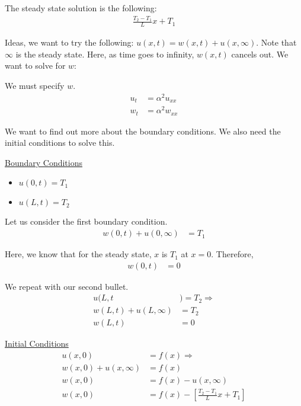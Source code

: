 
The steady state solution is the following:
%
\begin{align}
  \frac{T_2 - T_1}{L} x + T_1
\end{align}

Ideas, we want to try the following: $u(x, t) = w(x, t) + u(x, \infty)$. Note that $\infty$ is the steady state. Here, as time goes to infinity, $w(x, t)$ cancels out. We want to solve for $w$:

We must specify $w$.
%
\begin{align}
  u_t & = \alpha^2 u_{xx}\\
  w_t & = \alpha^2 w_{xx}
\end{align}

We want to find out more about the boundary conditions. We also need the initial conditions to solve this.

\underline{Boundary Conditions}
\begin{itemize}
  \item $u(0, t) = T_1$
  \item $u(L, t) = T_2$
\end{itemize}

Let us consider the first boundary condition.
%
\begin{align}
  w(0, t) + u(0, \infty) & = T_1
\end{align}

Here, we know that for the steady state, $x$ is $T_1$ at $x = 0$. Therefore,
%
\begin{align}
  w(0, t) & = 0
\end{align}

We repeat with our second bullet.
%
\begin{align}
  u(L, t &) = T_2 \Rightarrow\\
  w(L, t) + u(L, \infty) & = T_2\\
  w(L, t) & = 0
\end{align}

\underline{Initial Conditions}
%
\begin{align}
  u(x, 0) & = f(x) \Rightarrow\\
  w(x, 0) + u(x, \infty) & = f(x)\\
  w(x, 0) & = f(x) - u(x, \infty)\\
  w(x, 0) & = f(x) - \left[ \frac{T_2 - T_1}{L} x + T_1 \right]
\end{align}

\ex

